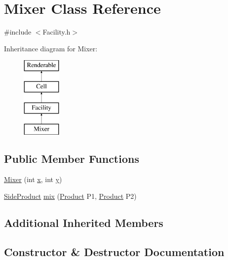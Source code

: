 \hypertarget{classMixer}{}\section{Mixer Class Reference}
\label{classMixer}


{\ttfamily \#include $<$Facility.\+h$>$}

Inheritance diagram for Mixer\+:\begin{figure}[H]
\begin{center}
\leavevmode
\includegraphics[height=4.000000cm]{classMixer}
\end{center}
\end{figure}
\subsection*{Public Member Functions}
\begin{DoxyCompactItemize}
\item 
\mbox{\hyperlink{classMixer_a5620a7de2a956fb9eb512ef534e5ad18}{Mixer}} (int \mbox{\hyperlink{classFacility_a97a4d1f6f807e0e74c4283cf120daed9}{x}}, int \mbox{\hyperlink{classFacility_a28d1fbfe0699e800db094161504b0e44}{y}})
\item 
\mbox{\hyperlink{classSideProduct}{Side\+Product}} \mbox{\hyperlink{classMixer_a9352a81375709063c7473e3951f51214}{mix}} (\mbox{\hyperlink{classProduct}{Product}} P1, \mbox{\hyperlink{classProduct}{Product}} P2)
\end{DoxyCompactItemize}
\subsection*{Additional Inherited Members}


\subsection{Constructor \& Destructor Documentation}
\mbox{\label{classMixer_a5620a7de2a956fb9eb512ef534e5ad18}} 
